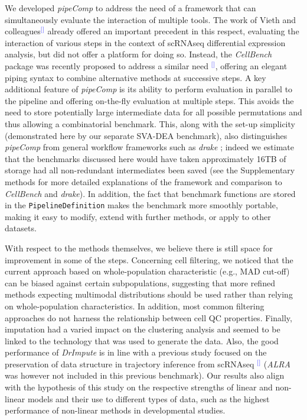 \documentclass[11pt]{article}
\renewcommand{\cite}[1]{\textcolor{Blue}{$^[$\supercite{#1}$^]$}}
\begin{document}
We developed \textit{pipeComp} to address the need of a framework that can simultaneously evaluate the interaction of multiple tools. The work of Vieth and colleagues\cite{viethSystematic2019} already offered an important precedent in this respect, evaluating the interaction of various steps in the context of scRNAseq differential expression analysis, but did not offer a platform for doing so. Instead, the \textit{CellBench} package was recently proposed to address a similar need \cite{suCellbench}, offering an elegant piping syntax to combine alternative methods at successive steps. A key additional feature of \textit{pipeComp} is its ability to perform evaluation in parallel to the pipeline and offering on-the-fly evaluation at {\color{red}multiple steps. This avoids the need to store potentially large intermediate data for all possible permutations and thus allowing a combinatorial benchmark. This, along with the set-up simplicity (demonstrated here by our separate SVA-DEA benchmark), also distinguishes \textit{pipeComp} from general workflow frameworks such as \textit{drake} \citep{landauDrakePackage2018}; indeed we estimate that the benchmarks discussed here would have taken approximately 16TB of storage had all non-redundant intermediates been saved (see the Supplementary methods for more detailed explanations of the framework and comparison to \textit{CellBench} and \textit{drake}).} In addition, the fact that benchmark functions are stored in the \texttt{PipelineDefinition} makes the benchmark more smoothly portable, making it easy to modify, extend with further methods, or apply to other datasets.

With respect to the methods themselves, we believe there is still space for improvement in some of the steps. Concerning cell filtering, we noticed that the current approach based on whole-population characteristic (e.g., MAD cut-off) can be biased against certain subpopulations, suggesting that more refined methods expecting multimodal distributions should be used rather than relying on whole-population characteristics. In addition, most common filtering approaches do not harness the relationship between cell QC properties. Finally, imputation had a varied impact on the clustering analysis and seemed to be linked to the technology that was used to generate the data. Also, the good performance of \textit{DrImpute} is in line with a previous study focused on the preservation of data structure in trajectory inference from scRNAseq \cite{ZhangImput2018} (\textit{ALRA} was however not included in this previous benchmark). Our results also align with the hypothesis of this study on the respective strengths of linear and non-linear models and their use to different types of data, such as the highest performance of non-linear methods in developmental studies. 
\end{document}
